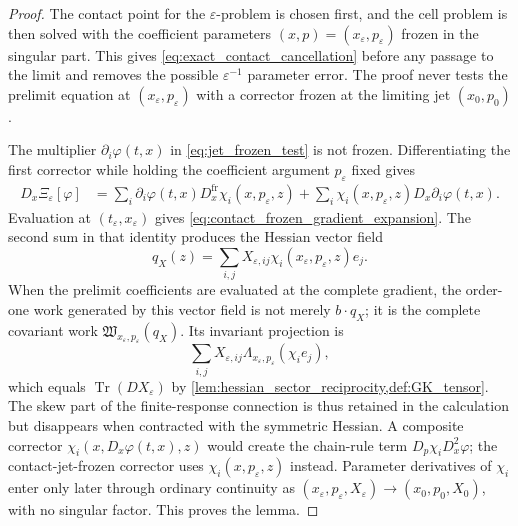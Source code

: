 \documentclass[12pt, letterpaper]{amsart}
\providecommand{\Tr}{\operatorname{Tr}}
\theoremstyle{plain}
\theoremstyle{definition}
\theoremstyle{remark}
\begin{document}
\begin{proof}
The contact point for the $\varepsilon$-problem is chosen first, and the cell
problem is then solved with the coefficient parameters
$(x,p)=(x_\varepsilon,p_\varepsilon)$ frozen in the singular part.  This gives
\eqref{eq:exact_contact_cancellation} before any passage to the limit and
removes the possible $\varepsilon^{-1}$ parameter error.  The proof never tests
the prelimit equation at $(x_\varepsilon,p_\varepsilon)$ with a corrector frozen
at the limiting jet $(x_0,p_0)$.

The multiplier $\partial_i\varphi(t,x)$ in \eqref{eq:jet_frozen_test} is not
frozen.  Differentiating the first corrector while holding the coefficient
argument $p_\varepsilon$ fixed gives
\begin{align}
    D_x\Xi_\varepsilon[\varphi]
    &=\sum_i \partial_i\varphi(t,x)D_x^{\mathrm{fr}}\chi_i(x,p_\varepsilon,z)
      +\sum_i \chi_i(x,p_\varepsilon,z)D_x\partial_i\varphi(t,x).
\end{align}
Evaluation at $(t_\varepsilon,x_\varepsilon)$ gives
\eqref{eq:contact_frozen_gradient_expansion}.  The second sum in that identity
produces the Hessian vector field
\begin{equation}
    q_X(z)=\sum_{i,j}X_{\varepsilon,ij}\chi_i(x_\varepsilon,p_\varepsilon,z)e_j .
\end{equation}
When the prelimit coefficients are evaluated at the complete gradient, the
order-one work generated by this vector field is not merely $b\cdot q_X$; it is
the complete covariant work $\mathfrak W_{x_\varepsilon,p_\varepsilon}(q_X)$.
Its invariant projection is
\begin{equation}
    \sum_{i,j}X_{\varepsilon,ij}
      \Lambda_{x_\varepsilon,p_\varepsilon}(\chi_i e_j),
\end{equation}
which equals $\Tr(DX_\varepsilon)$ by
\cref{lem:hessian_sector_reciprocity,def:GK_tensor}.  The skew part of the
finite-response connection is thus retained in the calculation but disappears
when contracted with the symmetric Hessian.  A composite corrector
$\chi_i(x,D_x\varphi(t,x),z)$ would create the chain-rule term
$D_p\chi_iD_x^2\varphi$; the contact-jet-frozen corrector uses
$\chi_i(x,p_\varepsilon,z)$ instead.  Parameter derivatives of $\chi_i$ enter
only later through ordinary continuity as
$(x_\varepsilon,p_\varepsilon,X_\varepsilon)\to(x_0,p_0,X_0)$, with no singular
factor.  This proves the lemma.
\end{proof}
\end{document}
